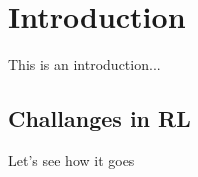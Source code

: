 
\chapter{Introduction}
This is an introduction...

\section{Challanges in RL}
Let's see how it goes
